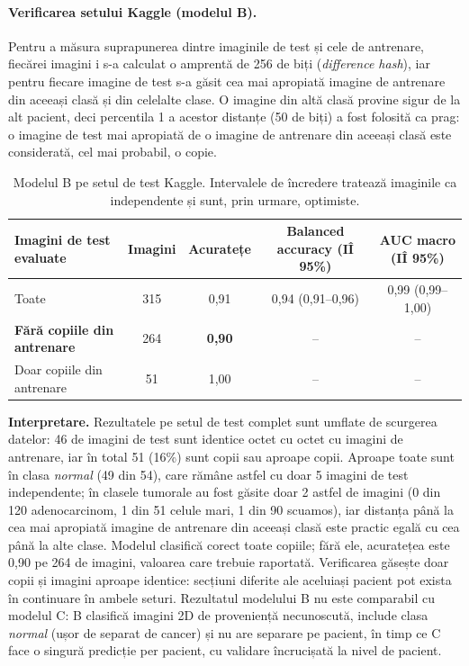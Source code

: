 \documentclass[11pt, a4paper]{article}
\begin{document}
\paragraph{Verificarea setului Kaggle (modelul B).} Pentru a măsura suprapunerea dintre imaginile de test și cele de antrenare, fiecărei imagini i s-a calculat o amprentă de 256 de biți (\textit{difference hash}), iar pentru fiecare imagine de test s-a găsit cea mai apropiată imagine de antrenare din aceeași clasă și din celelalte clase. O imagine din altă clasă provine sigur de la alt pacient, deci percentila 1 a acestor distanțe (50 de biți) a fost folosită ca prag: o imagine de test mai apropiată de o imagine de antrenare din aceeași clasă este considerată, cel mai probabil, o copie.

\begin{table}[h]
\centering
\footnotesize
\begin{tabular}{@{}lcccc@{}}
\toprule
\textbf{Imagini de test evaluate} & \textbf{Imagini} & \textbf{Acuratețe} & \textbf{Balanced accuracy (IÎ 95\%)} & \textbf{AUC macro (IÎ 95\%)} \\ \midrule
Toate & 315 & 0,91 & 0,94 (0,91--0,96) & 0,99 (0,99--1,00) \\
\textbf{Fără copiile din antrenare} & 264 & \textbf{0,90} & -- & -- \\
Doar copiile din antrenare & 51 & 1,00 & -- & -- \\ \bottomrule
\end{tabular}
\caption{Modelul B pe setul de test Kaggle. Intervalele de încredere tratează imaginile ca independente și sunt, prin urmare, optimiste.}
\label{tab:model_b}
\end{table}

\textbf{Interpretare.} Rezultatele pe setul de test complet sunt umflate de scurgerea datelor: 46 de imagini de test sunt identice octet cu octet cu imagini de antrenare, iar în total 51 (16\%) sunt copii sau aproape copii. Aproape toate sunt în clasa \textit{normal} (49 din 54), care rămâne astfel cu doar 5 imagini de test independente; în clasele tumorale au fost găsite doar 2 astfel de imagini (0 din 120 adenocarcinom, 1 din 51 celule mari, 1 din 90 scuamos), iar distanța până la cea mai apropiată imagine de antrenare din aceeași clasă este practic egală cu cea până la alte clase. Modelul clasifică corect toate copiile; fără ele, acuratețea este 0,90 pe 264 de imagini, valoarea care trebuie raportată. Verificarea găsește doar copii și imagini aproape identice: secțiuni diferite ale aceluiași pacient pot exista în continuare în ambele seturi. Rezultatul modelului B nu este comparabil cu modelul C: B clasifică imagini 2D de proveniență necunoscută, include clasa \textit{normal} (ușor de separat de cancer) și nu are separare pe pacient, în timp ce C face o singură predicție per pacient, cu validare încrucișată la nivel de pacient.
\end{document}
